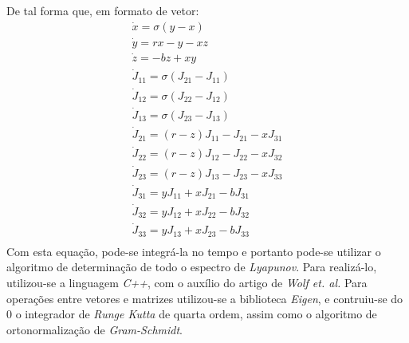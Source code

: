\documentclass{article}[twocolumn]
\begin{document}
	De tal forma que, em formato de vetor:
	\begin{equation}
		\begin{array}{l}
			\dot{x} = \sigma (y - x)\\
			\dot{y} = rx - y - xz\\
			\dot{z} = -bz + xy\\
			\dot{J}_{11} = \sigma (J_{21} - J_{11})\\
			\dot{J}_{12} = \sigma (J_{22} - J_{12})\\
			\dot{J}_{13} = \sigma (J_{23} - J_{13})\\
			\dot{J}_{21} = (r - z)J_{11} - J_{21} - xJ_{31}\\
			\dot{J}_{22} = (r - z)J_{12} - J_{22} - xJ_{32}\\
			\dot{J}_{23} = (r - z)J_{13} - J_{23} - xJ_{33}\\
			\dot{J}_{31} = yJ_{11} + xJ_{21} - bJ_{31}\\
			\dot{J}_{32} = yJ_{12} + xJ_{22} - bJ_{32}\\
			\dot{J}_{33} = yJ_{13} + xJ_{23} - bJ_{33}\\
		\end{array}
		\nonumber
	\end{equation}
	Com esta equa\c{c}\~ao, pode-se integr\'a-la no tempo e portanto pode-se utilizar o algoritmo
	de determina\c{c}\~ao de todo o espectro de \textit{Lyapunov}. Para realiz\'a-lo, utilizou-se
	a linguagem \textit{C++}, com o aux\'ilio do artigo de \textit{Wolf et. al.} Para
	opera\c{c}\~oes entre vetores e matrizes utilizou-se a biblioteca \textit{Eigen}, e
	contruiu-se do 0 o integrador de \textit{Runge Kutta} de quarta ordem, assim como o algoritmo
	de ortonormaliza\c{c}\~ao de \textit{Gram-Schmidt}.
\end{document}
